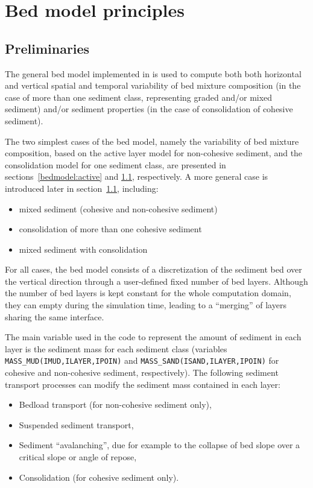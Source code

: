 \chapter[Bed model principles]{Bed model principles}

\section{Preliminaries}
The general bed model implemented in \gaia{} is used to compute both both horizontal and vertical spatial and temporal variability of bed mixture composition (in the case of more than one sediment class, representing graded and/or mixed sediment) and/or sediment properties (in the case of consolidation of cohesive sediment).

The two simplest cases of the bed model, namely the variability of bed mixture composition, based on the active layer model for non-cohesive sediment, and the consolidation model for one sediment class, are presented in sections~\ref{bedmodel:active} and \ref{}, respectively. A more general case is introduced later in section~\ref{}, including:
\begin{itemize}
\item mixed sediment (cohesive and non-cohesive sediment)
\item consolidation of more than one cohesive sediment
\item mixed sediment with consolidation
\end{itemize}

For all cases, the bed model consists of a discretization of the sediment bed over the vertical direction through a user-defined fixed number of bed layers. Although the number of bed layers is kept constant for the whole computation domain, they can empty during the simulation time, leading to a ``merging'' of layers sharing the same interface.

The main variable used in the code to represent the amount of sediment in each layer is the sediment mass for each sediment class (variables \texttt{MASS\_MUD(IMUD,ILAYER,IPOIN)} and \texttt{MASS\_SAND(ISAND,ILAYER,IPOIN)} for cohesive and non-cohesive sediment, respectively). The following sediment transport processes can modify the sediment mass contained in each layer: 
\begin{itemize}
\item Bedload transport (for non-cohesive sediment only),
\item Suspended sediment transport,
\item Sediment ``avalanching'', due for example to the collapse of bed slope over a critical slope or angle of repose,
\item Consolidation (for cohesive sediment only).
\end{itemize}

